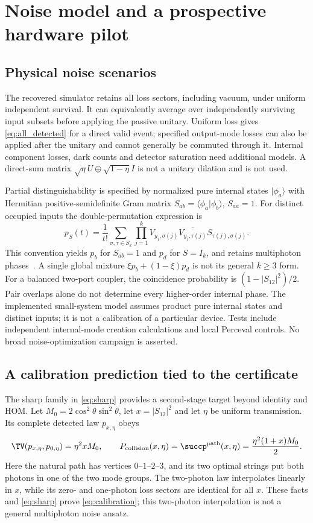 \section{Noise model and a prospective hardware pilot}\label{sec:pilot}
\subsection{Physical noise scenarios}
The recovered simulator retains all loss sectors, including vacuum, under uniform independent survival. It can equivalently average over independently surviving input subsets before applying the passive unitary. Uniform loss gives \cref{eq:all_detected} for a direct valid event; specified output-mode losses can also be applied after the unitary and cannot generally be commuted through it. Internal component losses, dark counts and detector saturation need additional models. A direct-sum matrix $\sqrt\eta U\oplus\sqrt{1-\eta}I$ is not a unitary dilation and is not used.

Partial distinguishability is specified by normalized pure internal states $|\phi_a\rangle$ with Hermitian positive-semidefinite Gram matrix $S_{ab}=\langle\phi_a|\phi_b\rangle$, $S_{aa}=1$. For distinct occupied inputs the double-permutation expression is
\begin{equation}
 p_S(t)=\frac1{t!}\sum_{\sigma,\tau\in S_k}
 \prod_{j=1}^k V_{y_j,\sigma(j)}\overline{V_{y_j,\tau(j)}}
 S_{\tau(j),\sigma(j)}.\label{eq:partial}
\end{equation}
This convention yields $p_b$ for $S_{ab}=1$ and $p_d$ for $S=I_k$, and retains multiphoton phases~\cite{tichy2015}. A single global mixture $\xi p_b+(1-\xi)p_d$ is not its general $k\ge3$ form. For a balanced two-port coupler, the coincidence probability is $(1-|S_{12}|^2)/2$. Pair overlaps alone do not determine every higher-order internal phase. The implemented small-system model assumes product pure internal states and distinct inputs; it is not a calibration of a particular device. Tests include independent internal-mode creation calculations and local Perceval controls. No broad noise-optimization campaign is asserted.

\subsection{A calibration prediction tied to the certificate}
The sharp family in \cref{eq:sharp} provides a second-stage target beyond identity and HOM. Let $M_0=2\cos^2\theta\sin^2\theta$, let $x=|S_{12}|^2$ and let $\eta$ be uniform transmission. Its complete detected law $p_{x,\eta}$ obeys
\begin{equation}
 \TV(p_{x,\eta},p_{0,\eta})=\eta^2 xM_0,\qquad
 P_{\rm collision}(x,\eta)=\succp^{\rm path}(x,\eta)
 =\frac{\eta^2(1+x)M_0}{2}.\label{eq:calibration}
\end{equation}
Here the natural path has vertices $0$--$1$--$2$--$3$, and its two optimal strings put both photons in one of the two mode groups. The two-photon law interpolates linearly in $x$, while its zero- and one-photon loss sectors are identical for all $x$. These facts and \cref{eq:sharp} prove \cref{eq:calibration}; this two-photon interpolation is not a general multiphoton noise ansatz.

